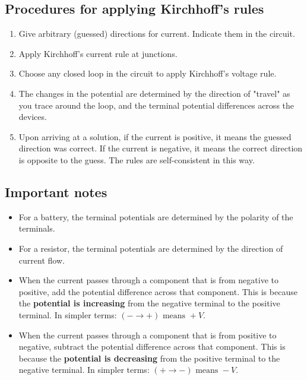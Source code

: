 \documentclass[11pt]{article}
\begin{document}
\subsection{Procedures for applying Kirchhoff's rules}
\label{sec:org6670192}
\begin{enumerate}
\item Give arbitrary (guessed) directions for current. Indicate them in the circuit.
\item Apply Kirchhoff's current rule at junctions.
\item Choose any closed loop in the circuit to apply Kirchhoff's voltage rule.
\item The changes in the potential are determined by the direction of "travel" as you trace around the loop, and the terminal potential differences across the devices.
\item Upon arriving at a solution, if the current is positive, it means the guessed direction was correct. If the current is negative, it means the correct direction is opposite to the guess. The rules are self-consistent in this way.
\end{enumerate}

\subsection{Important notes}
\label{sec:orgbe70d47}
\begin{itemize}
\item For a battery, the terminal potentials are determined by the polarity of the terminals.
\item For a resistor, the terminal potentials are determined by the direction of current flow.
\item When the current passes through a component that is from negative to positive, add the potential difference across that component. This is because the \textbf{potential is increasing} from the negative terminal to the positive terminal. In simpler terms: \((- \rightarrow +) \text{ means } + V\).
\item When the current passes through a component that is from positive to negative, subtract the potential difference across that component. This is because the \textbf{potential is decreasing} from the positive terminal to the negative terminal. In simpler terms: \((+ \rightarrow -) \text{ means } - V\).
\end{itemize}

\newpage
\end{document}
